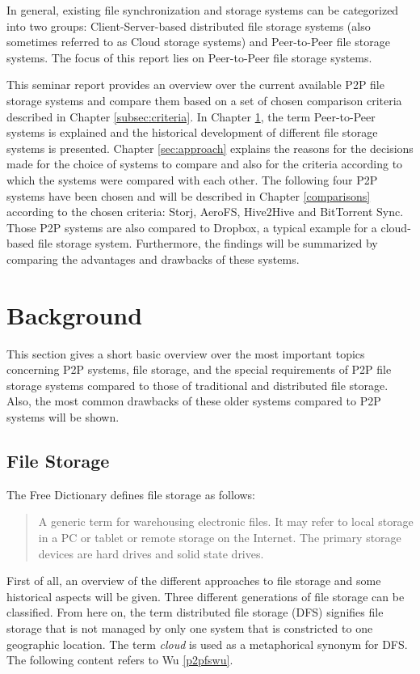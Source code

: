 In general, existing file synchronization and storage systems can be categorized into two groups: Client-Server-based distributed file storage systems (also sometimes referred to as Cloud storage systems) and Peer-to-Peer file storage systems. The focus of this report lies on Peer-to-Peer file storage systems.

This seminar report provides an overview over the current available P2P file storage systems and compare them based on a set of chosen comparison criteria described in Chapter \ref{subsec:criteria}. In Chapter \ref{sec:background}, the term Peer-to-Peer systems is explained and the historical development of different file storage systems is presented. Chapter \ref{sec:approach} explains the reasons for the decisions made for the choice of systems to compare and also for the criteria according to which the systems were compared with each other. The following four P2P systems have been chosen and will be described in Chapter \ref{comparisons} according to the chosen criteria: Storj, AeroFS, Hive2Hive and BitTorrent Sync. Those P2P systems are also compared to Dropbox, a typical example for a cloud-based file storage system. Furthermore, the findings will be summarized by comparing the advantages and drawbacks of these systems.

\section{Background}
\label{sec:background}
This section gives a short basic overview over the most important topics concerning P2P systems, file storage, and the special requirements of P2P file storage systems compared to those of traditional and distributed file storage. Also, the most common drawbacks of these older systems compared to P2P systems will be shown.

\subsection{File Storage}
The Free Dictionary defines file storage as follows:
\begin{quote}
A generic term for warehousing electronic files. It may refer to local storage in a PC or tablet or remote storage on the Internet. The primary storage devices are hard drives and solid state drives. \cite{thefreedictionary}
\end{quote}
First of all, an overview of the different approaches to file storage and some historical aspects will be given. Three different generations of file storage can be classified. From here on, the term distributed file storage (DFS) signifies file storage that is not managed by only one system that is constricted to one geographic location. The term \textit{cloud} is used as a metaphorical synonym for DFS. The following content refers to Wu \ref{p2pfswu}.

